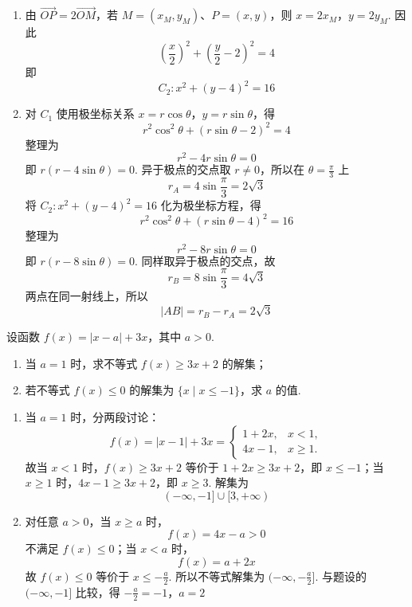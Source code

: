 \begin{solution}
\begin{enumerate}
\item 由 \(\overrightarrow{OP}=2\overrightarrow{OM}\)，若 \(M=(x_M,y_M)\)、\(P=(x,y)\)，则 \(x=2x_M\)，\(y=2y_M\). 因此
\[
\left(\frac{x}{2}\right)^{2}+\left(\frac{y}{2}-2\right)^{2}=4
\]
即
\[
C_{2}:x^{2}+(y-4)^{2}=16
\]
\item 对 \(C_{1}\) 使用极坐标关系 \(x=r\cos\theta\)，\(y=r\sin\theta\)，得
\[
r^{2}\cos^{2}\theta+(r\sin\theta-2)^{2}=4
\]
整理为
\[
r^{2}-4r\sin\theta=0
\]
即 \(r(r-4\sin\theta)=0\). 异于极点的交点取 \(r\neq0\)，所以在 \(\theta=\frac{\pi}{3}\) 上
\[
r_{A}=4\sin\frac\pi3=2\sqrt3
\]
将 \(C_{2}:x^{2}+(y-4)^{2}=16\) 化为极坐标方程，得
\[
r^{2}\cos^{2}\theta+(r\sin\theta-4)^{2}=16
\]
整理为
\[
r^{2}-8r\sin\theta=0
\]
即 \(r(r-8\sin\theta)=0\). 同样取异于极点的交点，故
\[
r_{B}=8\sin\frac\pi3=4\sqrt3
\]
两点在同一射线上，所以
\[
|AB|=r_{B}-r_{A}=2\sqrt3
\]
\end{enumerate}
\end{solution}

\begin{problem}
设函数 \(f(x)=|x-a|+3x\)，其中 \(a>0\).
\begin{enumerate}
\item 当 \(a=1\) 时，求不等式 \(f(x)\geqslant 3x+2\) 的解集；
\item 若不等式 \(f(x)\leqslant 0\) 的解集为 \(\{x\mid x\leqslant -1\}\)，求 \(a\) 的值.
\end{enumerate}
\end{problem}

\begin{solution}
\begin{enumerate}
\item 当 \(a=1\) 时，分两段讨论：
\[
f(x)=|x-1|+3x=
\begin{cases}
1+2x,&x<1,\\
4x-1,&x\geqslant1.
\end{cases}
\]
故当 \(x<1\) 时，\(f(x)\geqslant3x+2\) 等价于 \(1+2x\geqslant3x+2\)，即 \(x\leqslant-1\)；当 \(x\geqslant1\) 时，\(4x-1\geqslant3x+2\)，即 \(x\geqslant3\). 解集为
\[
(-\infty,-1]\cup[3,+\infty)
\]
\item 对任意 \(a>0\)，当 \(x\geqslant a\) 时，
\[
f(x)=4x-a>0
\]
不满足 \(f(x)\leqslant0\)；当 \(x<a\) 时，
\[
f(x)=a+2x
\]
故 \(f(x)\leqslant0\) 等价于 \(x\leqslant-\frac{a}{2}\). 所以不等式解集为 \((-\infty,-\frac{a}{2}]\). 与题设的 \((-\infty,-1]\) 比较，得
\(-\frac a2=-1\)，\(a=2\)
\end{enumerate}
\end{solution}
